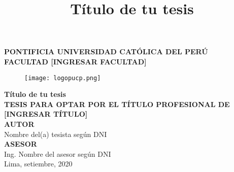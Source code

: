 \clearpage{\pagestyle{empty}\cleardoublepage}
\begin{titlepage}
\begin{center}
 {\Large \bf PONTIFICIA UNIVERSIDAD CATÓLICA DEL PERÚ}\\
  \vspace{0.8 cm} 
  {\Large \bf FACULTAD [INGRESAR FACULTAD]}\\
  \vspace{1.75 cm}
 \begin{figure}[H]
    \centering
    \texttt{[image: logopucp.png]}
\end{figure}
  \vspace{0.25cm}

\title{Título de tu tesis} %
{\Large \bf Título de tu tesis}\\ %
\vspace{0.5cm}
{\Large \bf TESIS PARA OPTAR POR EL TÍTULO PROFESIONAL DE [INGRESAR TÍTULO]}\\[2.5 cm]
{\large \bf AUTOR}\\[0.5cm]
{\large Nombre del(a) tesista según DNI}\\[1.75 cm] %
{\large \bf ASESOR}\\[0.5 cm] 
{\large Ing. Nombre del asesor según DNI}\\[0.5 cm] %
\vspace{2.5 cm}
{\large Lima, setiembre, 2020}

\end{center}
\end{titlepage}